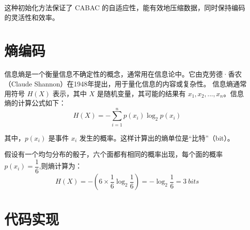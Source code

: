 \documentclass{/home/hi/Study/template/code}
\begin{document}
这种初始化方法保证了 CABAC 的自适应性，能有效地压缩数据，同时保持编码的灵活性和效率。


\newpage
\section{熵编码}
\begin{definition}
	信息熵是一个衡量信息不确定性的概念，通常用在信息论中。它由克劳德·香农（Claude Shannon）在1948年提出，用于量化信息的内容或复杂性。
	信息熵通常用符号 \( H(X) \) 表示，其中 \( X \) 是随机变量，其可能的结果有 \( x_1, x_2, ..., x_n \)。信息熵的计算公式如下：
	\begin{equation}
		H( X ) = - \sum_{i=1}^{n} p( x_i  ) \log_2 p( x_i )
	\end{equation}
\end{definition}
其中，\( p(x_i) \) 是事件 \( x_i \) 发生的概率。这样计算出的熵单位是“比特”（bit）。

假设有一个均匀分布的骰子，六个面都有相同的概率出现，每个面的概率 \( p(x_i) = \dfrac{1}{6} \),则熵计算为：
\begin{equation}
	H(X) = -\left(6 \times \frac{1}{6} \log_2 \frac{1}{6}\right) = -\log_2 \frac{1}{6} = 3 ~ bits
\end{equation}

\newpage
\section{代码实现}
\end{document}
